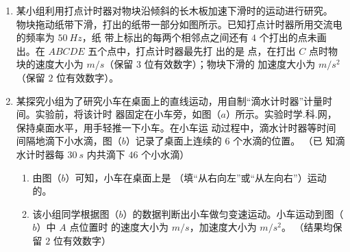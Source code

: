 \begin{enumerate}
\renewcommand{\labelenumi}{\arabic{enumi}.}
\item
{}
某小组利用打点计时器对物块沿倾斜的长木板加速下滑时的运动进行研究。
物块拖动纸带下滑，打出的纸带一部分如图所示。已知打点计时器所用交流电的频率为 $ 50 \ Hz $，纸
带上标出的每两个相邻点之间还有 $ 4 $ 个打出的点未画出。在 $ ABCDE $ 五个点中，打点计时器最先打
出的是  点，在打出 $ C $ 点时物块的速度大小为
$ m/s $（保留 $ 3 $ 位有效数字）；物块下滑的
加速度大小为
$ m/s^{2} $（保留 $ 2 $ 位有效数字）。
\begin{figure}[h!]
\centering

\end{figure}

\banswer{

}

\item 
{}
某探究小组为了研究小车在桌面上的直线运动，用自制“滴水计时器”计量时间。实验前，将该计时
器固定在小车旁，如图（$ a $）所示。实验时学.科.网，保持桌面水平，用手轻推一下小车。在小车运
动过程中，滴水计时器等时间间隔地滴下小水滴，图（$ b $）记录了桌面上连续的 $ 6 $ 个水滴的位置。
（已
知滴水计时器每 $ 30 \ s $ 内共滴下 $ 46 $ 个小水滴）
\begin{figure}[h!]
\centering

\end{figure}






\begin{enumerate}
\renewcommand{\labelenumi}{\arabic{enumi}.}
\item
由图（$ b $）可知，小车在桌面上是  （填“从右向左”或“从左向右”）运动的。
\item 
该小组同学根据图（$ b $）的数据判断出小车做匀变速运动。小车运动到图（$ b $）中 $ A $ 点位置时
的速度大小为  $ m/s $，加速度大小为  $ m/s^{2} $。
（结果均保留 $ 2 $ 位有效数字）





\end{enumerate}
\end{enumerate}
